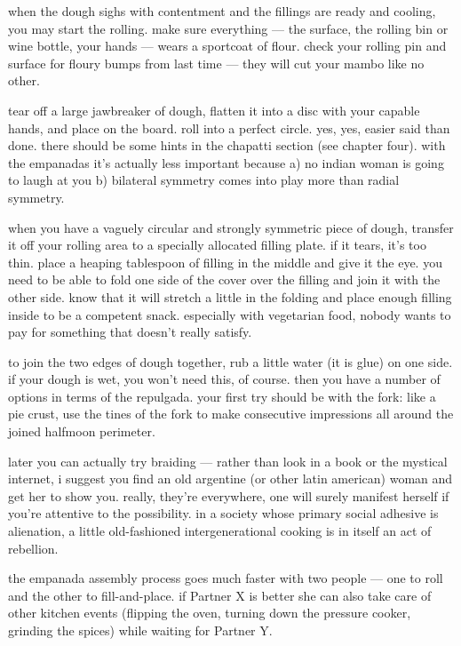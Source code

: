 when the dough sighs with contentment and the fillings are ready and
cooling, you may start the rolling. make sure everything --- the
surface, the rolling bin or wine bottle, your hands --- wears a
sportcoat of flour. check your rolling pin and surface for floury
bumps from last time --- they will cut your mambo like no other.

tear off a large jawbreaker of dough, flatten it into a disc with your
capable hands, and place on the board. roll into a perfect
circle. yes, yes, easier said than done. there should be some hints in
the chapatti section (see chapter four). with the empanadas it's
actually less important because a) no indian woman is going to laugh
at you b) bilateral symmetry comes into play more than radial
symmetry.

when you have a vaguely circular and strongly symmetric piece of
dough, transfer it off your rolling area to a specially allocated
filling plate. if it tears, it's too thin. place a heaping tablespoon
of filling in the middle and give it the eye. you need to be able to
fold one side of the cover over the filling and join it with the other
side. know that it will stretch a little in the folding and place
enough filling inside to be a competent snack. especially with
vegetarian food, nobody wants to pay for something that doesn't really
satisfy.

to join the two edges of dough together, rub a little water (it is
glue) on one side. if your dough is wet, you won't need this, of
course. then you have a number of options in terms of the
\gls{repulgada}. your first try
should be with the fork: like a pie crust, use the tines of the fork
to make consecutive impressions all around the joined halfmoon
perimeter.

later you can actually try braiding --- rather than look in a book or
the mystical internet, i suggest you find an old argentine (or other
latin american) woman and get her to show you. really, they're
everywhere, one will surely manifest herself if you're attentive to
the possibility. in a society whose primary social adhesive is
alienation, a little old-fashioned intergenerational cooking is in
itself an act of rebellion.

the empanada assembly process goes much faster with two people --- one
to roll and the other to fill-and-place. if Partner X is better she
can also take care of other kitchen events (flipping the oven, turning
down the pressure cooker, grinding the spices) while waiting for
Partner Y.

